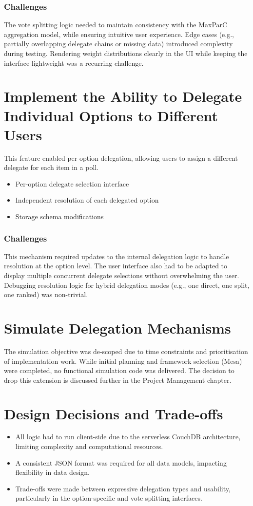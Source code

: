 \subsubsection{Challenges}
The vote splitting logic needed to maintain consistency with the MaxParC aggregation model, while ensuring intuitive user experience. Edge cases (e.g., partially overlapping delegate chains or missing data) introduced complexity during testing. Rendering weight distributions clearly in the UI while keeping the interface lightweight was a recurring challenge.

\section{Implement the Ability to Delegate Individual Options to Different Users}
This feature enabled per-option delegation, allowing users to assign a different delegate for each item in a poll.

\begin{itemize}
  \item Per-option delegate selection interface
  \item Independent resolution of each delegated option
  \item Storage schema modifications
\end{itemize}

\subsubsection{Challenges}
This mechanism required updates to the internal delegation logic to handle resolution at the option level. The user interface also had to be adapted to display multiple concurrent delegate selections without overwhelming the user. Debugging resolution logic for hybrid delegation modes (e.g., one direct, one split, one ranked) was non-trivial.

\section{Simulate Delegation Mechanisms}
The simulation objective was de-scoped due to time constraints and prioritisation of implementation work. While initial planning and framework selection (Mesa) were completed, no functional simulation code was delivered. The decision to drop this extension is discussed further in the Project Management chapter.

\section{Design Decisions and Trade-offs}
\begin{itemize}
  \item All logic had to run client-side due to the serverless CouchDB architecture, limiting complexity and computational resources.
  \item A consistent JSON format was required for all data models, impacting flexibility in data design.
  \item Trade-offs were made between expressive delegation types and usability, particularly in the option-specific and vote splitting interfaces.
\end{itemize}

